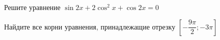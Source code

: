 \begin{ex}
	\begin{condition}
		\begin{enumcols}[label=\asbuk*)]
			\item Решите уравнение \( \sin 2x + 2\cos^2 x +\cos 2x = 0 \)
			\item Найдите все корни уравнения, принадлежащие отрезку \( \left[-\dfrac{9\pi}{2};-3\pi\right] \)
		\end{enumcols}
	\end{condition}
\end{ex}